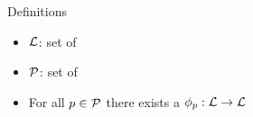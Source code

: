 \begin{frame}{Definitions}
	\begin{definition}
		\begin{itemize}
			\item $\mathcal{L}$: set of 
			\item $\mathcal{P}$: set of 
			\item For all $p \in \mathcal{P}$ there exists a $\phi_{p}: \mathcal{L} \rightarrow \mathcal{L}$
		\end{itemize}
	\end{definition}
\end{frame}
